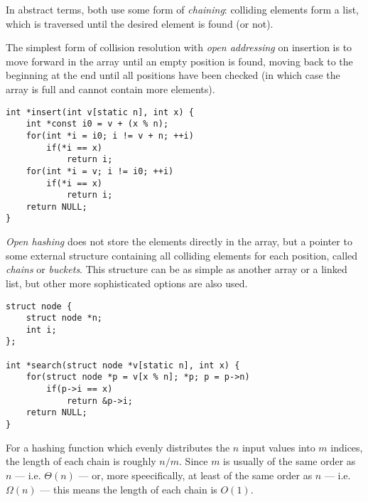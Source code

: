 In abstract terms, both use some form of \textit{chaining}: colliding elements
form a list, which is traversed until the desired element is found (or not).

The simplest form of collision resolution with \textit{open addressing} on
insertion is to move forward in the array until an empty position is found,
moving back to the beginning at the end until all positions have been checked
(in which case the array is full and cannot contain more elements).

\begin{lstlisting}[style=c]
int *insert(int v[static n], int x) {
    int *const i0 = v + (x % n);
    for(int *i = i0; i != v + n; ++i)
        if(*i == x)
            return i;
    for(int *i = v; i != i0; ++i)
        if(*i == x)
            return i;
    return NULL;
}
\end{lstlisting}

\textit{Open hashing} does not store the elements directly in the array, but a
pointer to some external structure containing all colliding elements for each
position, called \textit{chains} or \textit{buckets}.  This structure can be as
simple as another array or a linked list, but other more sophisticated options
are also used.

\begin{lstlisting}[style=c]
struct node {
    struct node *n;
    int i;
};

int *search(struct node *v[static n], int x) {
    for(struct node *p = v[x % n]; *p; p = p->n)
        if(p->i == x)
            return &p->i;
    return NULL;
}
\end{lstlisting}

For a hashing function which evenly distributes the $n$ input values into $m$
indices, the length of each chain is roughly $n/m$.  Since $m$ is usually of the
same order as $n$ --- i.e. $\Theta(n)$ --- or, more speecifically, at least of
the same order as $n$ --- i.e. $\Omega(n)$ --- this means the length of each
chain is $O(1)$.


